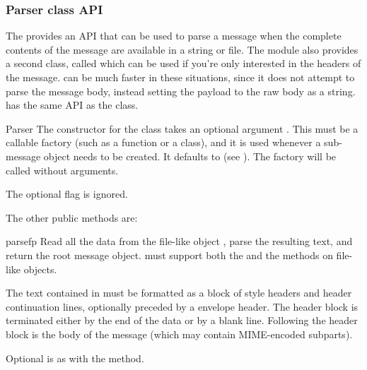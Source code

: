 \subsubsection{Parser class API}

The  provides an API that can be used to parse a message when
the complete contents of the message are available in a string or file.  The
 module also provides a second class, called
 which can be used if you're only interested in
the headers of the message.  can be much faster in
these situations, since it does not attempt to parse the message body,
instead setting the payload to the raw body as a string.
 has the same API as the  class.

\begin{classdesc}{Parser}{}
The constructor for the  class takes an optional
argument .  This must be a callable factory (such as a
function or a class), and it is used whenever a sub-message object
needs to be created.  It defaults to  (see
).  The factory will be called without
arguments.

The optional  flag is ignored.  

\end{classdesc}

The other public  methods are:

\begin{methoddesc}[Parser]{parse}{fp}
Read all the data from the file-like object , parse the
resulting text, and return the root message object.   must
support both the  and the  methods
on file-like objects.

The text contained in  must be formatted as a block of 
style headers and header continuation lines, optionally preceded by a
envelope header.  The header block is terminated either by the
end of the data or by a blank line.  Following the header block is the
body of the message (which may contain MIME-encoded subparts).

Optional  is as with the  method.

\end{methoddesc}

